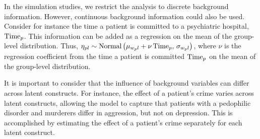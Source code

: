 \documentclass[a4paper,usenames,dvipsnames]{article}
\begin{document}
In the simulation studies, we restrict the analysis to discrete background information. However, continuous background information could also be used. Consider for instance the time a patient is committed to a psychiatric hospital, $\mathrm{Time}_p$.  This information can be added as a regression on the mean of the group-level distribution. Thus, $\eta_{pl} \sim \text{Normal}\left(\mu_{w_pl} + \nu\,\mathrm{Time}_p,\,\sigma_{w_pl}\right)$, where $\nu$ is the regression coefficient from the time a patient is committed $\mathrm{Time}_p$ on the mean of the group-level distribution.

It is important to consider that the influence of background variables can differ across latent constructs. For instance, the effect of a patient's crime varies across latent constructs, allowing the model to capture that patients with a pedophilic disorder and murderers differ in aggression, but not on depression. This is accomplished by estimating the effect of a patient's crime separately for each latent construct.
\end{document}

